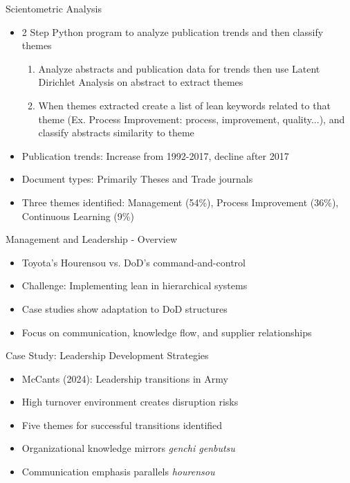 \documentclass[aspectratio=169,11pt,xcolor={dvipsnames},hyperref={pdftex,pdfpagemode=UseNone,hidelinks,pdfdisplaydoctitle=true},usepdftitle=false]{beamer}
\begin{document}
    \begin{frame}{Scientometric Analysis}
      \begin{itemize}
        \item 2 Step Python program to analyze publication trends and then classify themes
        \begin{enumerate}
          \item Analyze abstracts and publication data for trends then use Latent Dirichlet Analysis on abstract to extract themes
          \item When themes extracted create a list of lean keywords related to that theme (Ex. Process Improvement: process, improvement, quality...), and classify abstracts similarity to theme
        \end{enumerate}
        \item Publication trends: Increase from 1992-2017, decline after 2017
        \item Document types: Primarily Theses and Trade journals
        \item Three themes identified: Management (54\%), Process Improvement (36\%), Continuous Learning (9\%)
      \end{itemize}
    \end{frame}



    \begin{frame}{Management and Leadership - Overview}
      \begin{itemize}
        \item Toyota's Hourensou vs. DoD's command-and-control
        \item Challenge: Implementing lean in hierarchical systems
        \item Case studies show adaptation to DoD structures
        \item Focus on communication, knowledge flow, and supplier relationships
      \end{itemize}
    \end{frame}

    \begin{frame}{Case Study: Leadership Development Strategies}
      \begin{itemize}
        \item McCants (2024): Leadership transitions in Army
        \item High turnover environment creates disruption risks
        \item Five themes for successful transitions identified
        \item Organizational knowledge mirrors \textit{genchi genbutsu}
        \item Communication emphasis parallels \textit{hourensou}
      \end{itemize}
    \end{frame}
\end{document}
